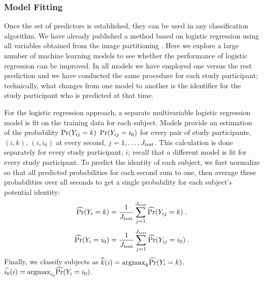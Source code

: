 \subsubsection{Model Fitting}\label{subsec:modelfitting}
Once the set of predictors is established, they can be used in any classification algorithm. We have already published a method based on logistic regression using all variables obtained from the image partitioning \cite{koffman_fingerprinting_2023}. Here we explore a large number of machine learning models to see whether the performance of logistic regression can be improved. In all models we have employed one versus the rest prediction and we have conducted the same procedure for each study participant; technically, what changes from one model to another is the identifier for the study participant who is predicted at that time. 



For the logistic regression approach, a separate multivariable logistic regression model is fit on the training data for each subject. Models provide an estimation of the probability ${\rm Pr}(Y_{ij}=k)$ ${\rm Pr}(Y_{ij}=i_0)$ for every pair of study participants, $(i,k)$, $(i,i_0)$ at every second, $j=1,\ldots, J_{\rm test}$. This calculation is done separately for every study participant, $i$; recall that a different model is fit for every study participant. To predict the identity of each subject, we first normalize so that all predicted probabilities for each second sum to one, then average these probabilities over all seconds to get a single probability for each subject's potential identity: $$\widehat{\rm Pr}(Y_{i} = k) = \frac{1}{J_\text{test}}\sum_{j=1}^{J_\text{test}}\widehat{\rm Pr}(Y_{ij} = k)\;.$$
$$\widehat{\rm Pr}(Y_{i} = i_0) = \frac{1}{J_\text{test}}\sum_{j=1}^{J_\text{test}}\widehat{\rm Pr}(Y_{ij} = i_0)\;.$$
Finally, we classify subjects as $\widehat{k}(i) = {\rm argmax}_{k} \widehat{\rm Pr}(Y_i=k)$. $\widehat{i_0}(i) = {\rm argmax}_{i_0} \widehat{\rm Pr}(Y_i=i_0)$.



